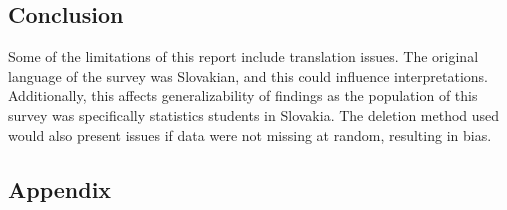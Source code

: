 \documentclass[]{article}
\begin{document}
\subsection{Conclusion}\label{conclusion}

Some of the limitations of this report include translation issues. The
original language of the survey was Slovakian, and this could influence
interpretations. Additionally, this affects generalizability of findings
as the population of this survey was specifically statistics students in
Slovakia. The deletion method used would also present issues if data
were not missing at random, resulting in bias.

\newpage

\subsection{Appendix}\label{appendix}
\end{document}
